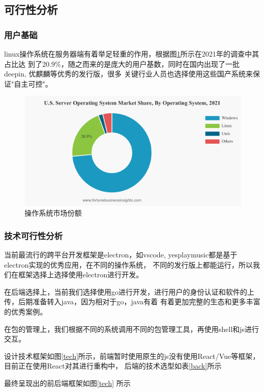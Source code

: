 \documentclass[supercite]{Experimental_Report}
\theoremstyle{definition}
\begin{document}
\newpage
\subsection{可行性分析}
\subsubsection{用户基础}

linux操作系统在服务器端有着举足轻重的作用，根据图\ref{linux}所示在2021年的调查中其占比达
到了20.9\%，随之而来的是庞大的用户基数，同时在国内出现了一批deepin, 优麒麟等优秀的发行版，很多
关键行业人员也选择使用这些国产系统来保证"自主可控"。
\begin{figure}[ht]
    \centering
    \includegraphics[scale=0.5]{./images/linux_par.png}
    \caption{操作系统市场份额}
	\label{linux}
\end{figure}

\subsubsection{技术可行性分析}
当前最流行的跨平台开发框架是electron，如vscode, yesplaymusic都是基于electron实现的优秀应用，在不同的操作系统，
不同的发行版上都能运行，所以我们在框架选择上选择使用electron进行开发。

在后端选择上，当前我们选择使用go进行开发，进行用户的身份认证和软件的上传，后期准备转入java，因为相对于go，java有着
有着更加完整的生态和更多丰富的优秀案例。

在包的管理上，我们根据不同的系统调用不同的包管理工具，再使用shell和js进行交互。

设计技术框架如图\ref{tech}所示，前端暂时使用原生的js没有使用React/Vue等框架，目前正在使用React对其进行重构中，
后端的技术选型如表\ref{back}所示
\newpage

\begin{table}[!h]
	\centering
	\caption{后端技术选型}
	\label{back}
\end{table}
最终呈现出的前后端框架如图\ref{tech} 所示
\end{document}
